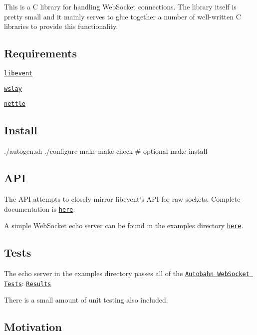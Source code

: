 This is a C library for handling Web\-Socket connections. The library itself is pretty small and it mainly serves to glue together a number of well-\/written C libraries to provide this functionality.

\subsection*{Requirements}


\begin{DoxyItemize}
\item \href{http://libevent.org/}{\tt libevent}
\item \href{http://wslay.sourceforge.net/}{\tt wslay}
\item \href{http://www.lysator.liu.se/~nisse/nettle/}{\tt nettle}
\end{DoxyItemize}

\subsection*{Install}

\begin{DoxyVerb}./autogen.sh
./configure
make
make check # optional
make install
\end{DoxyVerb}


\subsection*{A\-P\-I}

The A\-P\-I attempts to closely mirror libevent's A\-P\-I for raw sockets. Complete documentation is \href{http://crunchyfrog.github.io/libevws/doxygen/html/}{\tt here}.

A simple Web\-Socket echo server can be found in the examples directory \href{https://github.com/crunchyfrog/libevws/blob/master/examples/echo_server.c}{\tt here}.

\subsection*{Tests}

The echo server in the examples directory passes all of the \href{http://autobahn.ws/}{\tt Autobahn Web\-Socket Tests}\-: \href{http://crunchyfrog.github.io/libevws/autobahn/}{\tt Results}

There is a small amount of unit testing also included.

\subsection*{Motivation}

